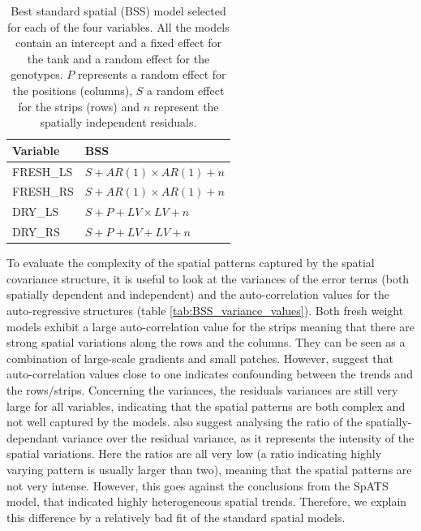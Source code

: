\begin{table}[htbp]
  \centering
  \caption[Selected BSS models]{Best standard spatial (BSS) model selected for each of the four variables. All the models 
  contain an intercept and a fixed effect for the tank and a random effect for the genotypes. $P$ represents a random effect for the positions (columns), $S$ a random effect for the strips (rows) and $n$ represent the spatially independent residuals.}
    \begin{tabular}{ll}
    \toprule
    Variable & \multicolumn{1}{l}{BSS} \\
    \midrule
    FRESH\_LS & $ S + AR(1) \times AR(1) + n$  \\
    FRESH\_RS &  $ S + AR(1) \times AR(1) + n$ \\
    DRY\_LS & $S + P + LV\times LV + n$ \\
    DRY\_RS &  $S + P + LV+LV+n$\\
    \bottomrule
    \end{tabular}%
\label{tab:selected_BSS_models}
\end{table}%

To evaluate the complexity of the spatial patterns captured by the spatial covariance structure, it is useful to look at the variances of the error terms (both spatially dependent and independent) and the auto-correlation values for the auto-regressive structures (table \ref{tab:BSS_variance_values}). Both fresh weight models exhibit a large auto-correlation value for the strips meaning that there are strong spatial variations along the rows and the columns. They can be seen as a combination of large-scale gradients and small patches. However, \textcite{piepho_problems_2015} suggest that auto-correlation values close to one indicates confounding between the trends and the rows/strips. Concerning the variances, the residuals variances are still very large for all variables, indicating that the spatial patterns are both complex and not well captured by the models. \textcite{dutkowski2002spatial} also suggest analysing the ratio of the spatially-dependant variance over the residual variance, as it represents the intensity of the spatial variations. Here the ratios are all very low (a ratio indicating highly varying pattern is usually larger than two), meaning that the spatial patterns are not very intense. However, this goes against the conclusions from the SpATS model, that indicated highly heterogeneous spatial trends. Therefore, we explain this difference by a relatively bad fit of the standard spatial models.\\

